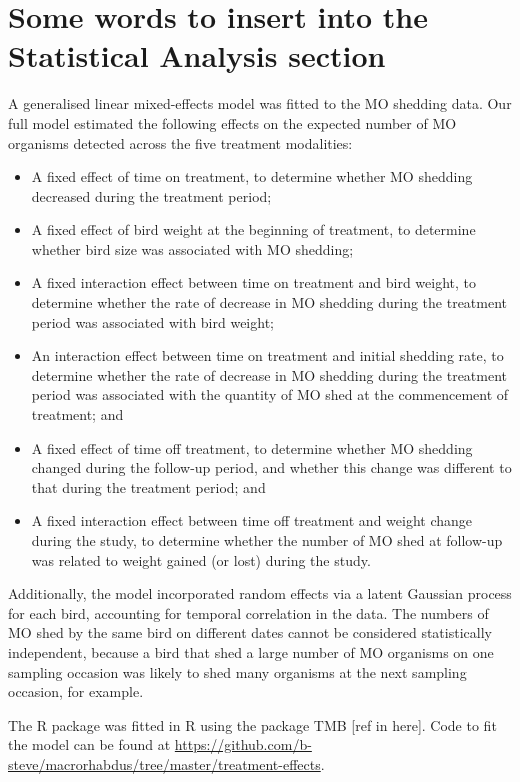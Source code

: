 \documentclass[11pt]{article}\usepackage[]{graphicx}\usepackage[]{color}
\begin{document}
\section{Some words to insert into the Statistical Analysis section}


A generalised linear mixed-effects model was fitted to the MO shedding
data. Our full model estimated the following effects on the
expected number of MO organisms detected across the five treatment
modalities:
\begin{itemize}
\item A fixed effect of time on treatment, to determine whether MO
  shedding decreased during the treatment period;
\item A fixed effect of bird weight at the beginning of treatment, to
  determine whether bird size was associated with MO shedding;
\item A fixed interaction effect between time on treatment and bird
  weight, to determine whether the rate of decrease in MO shedding
  during the treatment period was associated with bird weight;
\item An interaction effect between time on treatment and initial
  shedding rate, to determine whether the rate of decrease in MO
  shedding during the treatment period was associated with the
  quantity of MO shed at the commencement of treatment; and
\item A fixed effect of time off treatment, to determine whether MO
  shedding changed during the follow-up period, and whether this
  change was different to that during the treatment period; and
\item A fixed interaction effect between time off treatment and weight
  change during the study, to determine whether the number of MO shed
  at follow-up was related to weight gained (or lost) during the
  study.
\end{itemize}

Additionally, the model incorporated random effects via a latent
Gaussian process for each bird, accounting for temporal correlation in
the data. The numbers of MO shed by the same bird on different dates
cannot be considered statistically independent, because a bird that
shed a large number of MO organisms on one sampling occasion was
likely to shed many organisms at the next sampling occasion, for
example.

The R package was fitted in R using the package TMB [ref in
here]. Code to fit the model can be found at
\url{https://github.com/b-steve/macrorhabdus/tree/master/treatment-effects}.
\end{document}
